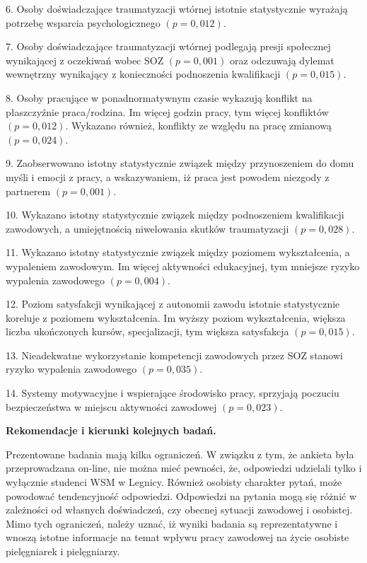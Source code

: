 \documentclass[a4paper,12pt,twoside,openright]{mwrep}
\begin{document}
6. Osoby doświadczające traumatyzacji wtórnej istotnie statystycznie wyrażają potrzebę wsparcia psychologicznego $(p = 0,012)$.

7. Osoby doświadczające traumatyzacji wtórnej podlegają presji społecznej  wynikającej z oczekiwań wobec SOZ $(p = 0,001)$ oraz odczuwają dylemat wewnętrzny wynikający z konieczności podnoszenia kwalifikacji $ (p = 0,015)$.

8. Osoby pracujące w ponadnormatywnym czasie wykazują konflikt na płaszczyźnie praca/rodzina. Im więcej godzin pracy, tym więcej konfliktów $( p=0,012)$.  Wykazano również, konflikty ze względu na pracę zmianową $(p = 0,024)$.

9. Zaobserwowano istotny statystycznie związek między przynoszeniem do domu myśli i emocji z pracy, a wskazywaniem, iż praca jest powodem niezgody z partnerem $(p = 0,001)$.

10. Wykazano istotny statystycznie związek między podnoszeniem kwalifikacji zawodowych, a umiejętnością niwelowania skutków traumatyzacji $(p=0,028)$.

11. Wykazano istotny statystycznie związek między poziomem wykształcenia, a wypaleniem zawodowym. Im więcej aktywności edukacyjnej, tym mniejsze ryzyko wypalenia zawodowego $(p=0,004)$.


12. Poziom satysfakcji wynikającej z autonomii zawodu istotnie statystycznie koreluje z poziomem wykształcenia. Im wyższy poziom wykształcenia, większa liczba ukończonych kursów, specjalizacji, tym większa satysfakcja $(p = 0,015)$.

13. Nieadekwatne wykorzystanie kompetencji zawodowych przez SOZ stanowi ryzyko wypalenia zawodowego $ (p = 0,035)$.

14.  Systemy motywacyjne i  wspierające środowisko pracy, sprzyjają poczuciu bezpieczeństwa w miejscu aktywności zawodowej $(p = 0,023)$.









\vspace{\baselineskip} 
\large
\textbf{Rekomendacje i kierunki kolejnych badań.}
\normalsize
\vspace{\baselineskip} 




Prezentowane badania mają kilka ograniczeń. W związku z tym, że ankieta była przeprowadzana on-line, nie można mieć pewności, że, odpowiedzi udzielali tylko i wyłącznie studenci WSM w Legnicy. Również osobisty charakter pytań, może powodować tendencyjność odpowiedzi. Odpowiedzi na pytania mogą się różnić w zależności od własnych doświadczeń,  czy obecnej sytuacji zawodowej i osobistej. Mimo tych ograniczeń, należy uznać, iż wyniki badania są reprezentatywne i wnoszą istotne informacje na temat wpływu pracy zawodowej na życie osobiste pielęgniarek i pielęgniarzy.
\end{document}
